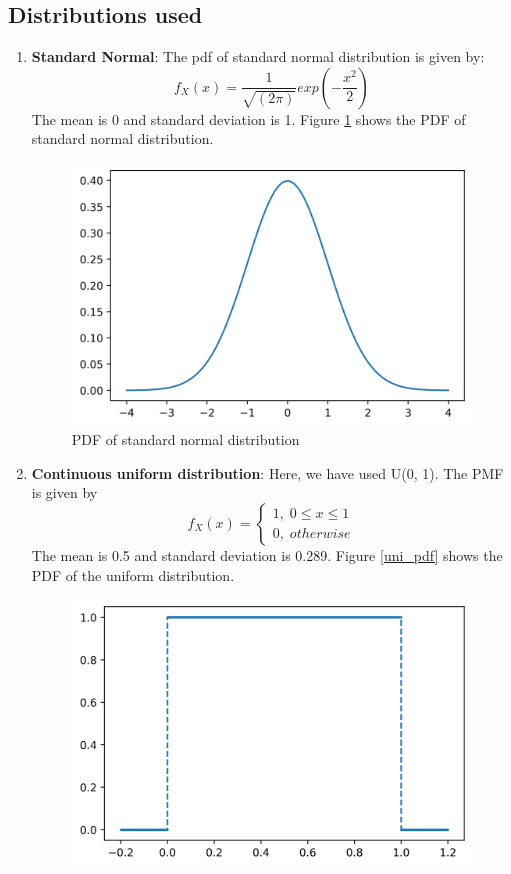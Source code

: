 \documentclass{article}
\begin{document}
\subsection{Distributions used}
\begin{enumerate}
    \item \textbf{Standard Normal}: The pdf of standard normal distribution is given by:
    $$f_X(x) = \dfrac{1}{\sqrt{(2\pi)}}exp\left(-\dfrac{x^2}{2}\right)$$
    The mean is 0 and standard deviation is 1. Figure \ref{normal_pdf} shows the PDF of standard normal distribution.
    \begin{figure}[H]
        \centering
        \includegraphics[scale=0.5]{images/gaussian.png}
        \caption{PDF of standard normal distribution}
        \label{normal_pdf}
    \end{figure}
    \item \textbf{Continuous uniform distribution}: Here, we have used U(0, 1). The PMF is given by $$f_X(x) = \begin{cases}1,\; 0 \le x \le 1 \\ 0,\; otherwise\end{cases}$$ 
    The mean is 0.5 and standard deviation is 0.289. Figure \ref{uni_pdf} shows the PDF of the uniform distribution.
    \begin{figure}[H]
        \centering
        \includegraphics[scale=0.5]{images/uniform.png}

\end{figure}
\end{enumerate}
\end{document}
